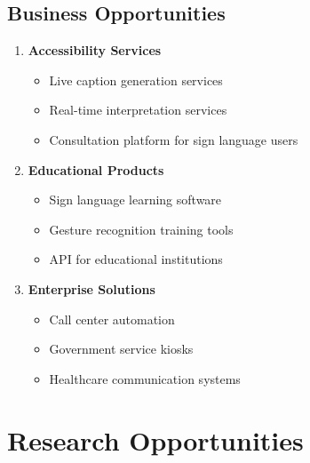 \subsection{Business Opportunities}

\begin{enumerate}
    \item \textbf{Accessibility Services}
    \begin{itemize}
        \item Live caption generation services
        \item Real-time interpretation services
        \item Consultation platform for sign language users
    \end{itemize}
    
    \item \textbf{Educational Products}
    \begin{itemize}
        \item Sign language learning software
        \item Gesture recognition training tools
        \item API for educational institutions
    \end{itemize}
    
    \item \textbf{Enterprise Solutions}
    \begin{itemize}
        \item Call center automation
        \item Government service kiosks
        \item Healthcare communication systems
    \end{itemize}
\end{enumerate}

\section{Research Opportunities}

